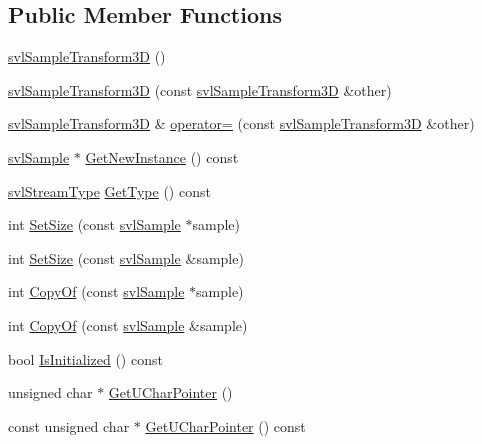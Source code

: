 \subsection*{Public Member Functions}
\begin{DoxyCompactItemize}
\item 
\hyperlink{classsvl_sample_transform3_d_aac6f38dfe210530007211d3c7cf4ee79}{svl\-Sample\-Transform3\-D} ()
\item 
\hyperlink{classsvl_sample_transform3_d_a6cced4e1ac941a83bcb5b6af1089cf15}{svl\-Sample\-Transform3\-D} (const \hyperlink{classsvl_sample_transform3_d}{svl\-Sample\-Transform3\-D} \&other)
\item 
\hyperlink{classsvl_sample_transform3_d}{svl\-Sample\-Transform3\-D} \& \hyperlink{classsvl_sample_transform3_d_a8fabdf6b11acb3009a039f7f329706bb}{operator=} (const \hyperlink{classsvl_sample_transform3_d}{svl\-Sample\-Transform3\-D} \&other)
\item 
\hyperlink{classsvl_sample}{svl\-Sample} $\ast$ \hyperlink{classsvl_sample_transform3_d_ac045767e17a10f4a42b1fc0e568bf22d}{Get\-New\-Instance} () const 
\item 
\hyperlink{svl_definitions_8h_aa00696d338a58db361335a01fd11e122}{svl\-Stream\-Type} \hyperlink{classsvl_sample_transform3_d_ab69212c88dd551726eec9f0883ebcb1e}{Get\-Type} () const 
\item 
int \hyperlink{classsvl_sample_transform3_d_a6b32c4145e10e6193d4d83828cb45fad}{Set\-Size} (const \hyperlink{classsvl_sample}{svl\-Sample} $\ast$sample)
\item 
int \hyperlink{classsvl_sample_transform3_d_abc127a5d4223724687cbf4982bd5f08c}{Set\-Size} (const \hyperlink{classsvl_sample}{svl\-Sample} \&sample)
\item 
int \hyperlink{classsvl_sample_transform3_d_a4dec1a9e2fdd122229711f94e9dba92e}{Copy\-Of} (const \hyperlink{classsvl_sample}{svl\-Sample} $\ast$sample)
\item 
int \hyperlink{classsvl_sample_transform3_d_a9b01c6e57f2c0138598df42db508da89}{Copy\-Of} (const \hyperlink{classsvl_sample}{svl\-Sample} \&sample)
\item 
bool \hyperlink{classsvl_sample_transform3_d_a282e1f27d31932a7a8b58dfa8db3ecec}{Is\-Initialized} () const 
\item 
unsigned char $\ast$ \hyperlink{classsvl_sample_transform3_d_aea81ed64be254fe18907908f2e936a2a}{Get\-U\-Char\-Pointer} ()
\item 
const unsigned char $\ast$ \hyperlink{classsvl_sample_transform3_d_a1545342a3baa4215817893732b1fee2b}{Get\-U\-Char\-Pointer} () const 

\end{DoxyCompactItemize}
